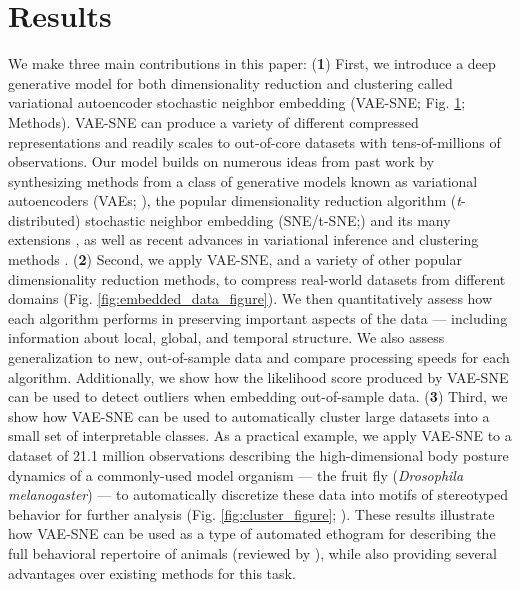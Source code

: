 \documentclass[11pt,a4paper,oneside]{book}
\begin{document}
\begin{doublespace}
\begin{figure}[!htb]
\label{fig:vaesne_figure} %

\end{figure}

\section{Results}
We make three main contributions in this paper: (\textbf{1}) First, we introduce a deep generative model for both dimensionality reduction and clustering called variational autoencoder stochastic neighbor embedding (VAE-SNE; Fig. \ref{fig:vaesne_figure}; Methods). VAE-SNE can produce a variety of different compressed representations and readily scales to out-of-core datasets with tens-of-millions of observations. Our model builds on numerous ideas from past work by synthesizing methods from a class of generative models known as variational autoencoders (VAEs; \citealt{kingma2013vae}), the popular dimensionality reduction algorithm (\textit{t}-distributed) stochastic neighbor embedding (SNE/t-SNE;\citealt{hinton2003stochastic, maaten2008tsne}) and its many extensions \citep{van2009ptsne, wang2016vmf, chien2017variational, ding2018scvis}, as well as recent advances in variational inference \citep{kingma2014semi, burda2015iwae, dilokthanakul2016gmvae, cremer2017reinterpreting, tomczak2017vae} and clustering methods \citep{todd2017systematic}. (\textbf{2}) Second, we apply VAE-SNE, and a variety of other popular dimensionality reduction methods, to compress real-world datasets from different domains (Fig. \ref{fig:embedded_data_figure}). We then quantitatively assess how each algorithm performs in preserving important aspects of the data --- including information about local, global, and temporal structure. We also assess generalization to new, out-of-sample data and compare processing speeds for each algorithm. Additionally, we show how the likelihood score produced by VAE-SNE can be used to detect outliers when embedding out-of-sample data. (\textbf{3}) Third, we show how VAE-SNE can be used to automatically cluster large datasets into a small set of interpretable classes. As a practical example, we apply VAE-SNE to a dataset of 21.1 million observations describing the high-dimensional body posture dynamics of a commonly-used model organism --- the fruit fly (\textit{Drosophila melanogaster}) --- to automatically discretize these data into motifs of stereotyped behavior for further analysis (Fig. \ref{fig:cluster_figure}; \citealt{berman2014mapping, pereira2019fast}). These results illustrate how VAE-SNE can be used as a type of automated ethogram for describing the full behavioral repertoire of animals (reviewed by \citealt{anderson2014toward, berman2018measuring, brown2018ethology, datta2019computational}), while also providing several advantages over existing methods for this task.



\end{doublespace}
\end{document}
